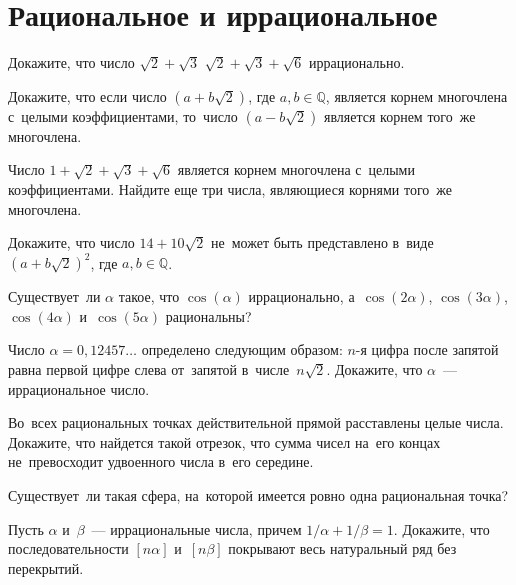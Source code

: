 
\section*{Рациональное и иррациональное}


\begin{problems}

\item
Докажите, что число
\quad
\subproblem $\sqrt{2} + \sqrt{3}$
\quad
\subproblem $\sqrt{2} + \sqrt{3} + \sqrt{6}$
\quad
иррационально.

\item
Докажите, что если число $(a + b \sqrt{2})$, где $a, b \in \mathbb{Q}$,
является корнем многочлена с~целыми коэффициентами, то~число $(a - b \sqrt{2})$ является корнем того~же многочлена.

\item
Число $1 + \sqrt{2} + \sqrt{3} + \sqrt{6}$ является корнем многочлена с~целыми
коэффициентами.
Найдите еще три числа, являющиеся корнями того~же многочлена.

\item
Докажите, что число $14 + 10 \sqrt{2}$ не~может быть представлено в~виде
$(a + b \sqrt{2})^2$, где $a, b \in \mathbb{Q}$.

\item
Существует~ли $\alpha$ такое, что $\cos(\alpha)$ иррационально,
а~$\cos(2 \alpha)$, $\cos(3 \alpha)$, $\cos(4 \alpha)$ и~$\cos(5 \alpha)$
рациональны?

\item
Число $\alpha = 0{,}12457{\ldots}$ определено следующим образом:
$n$-я цифра после запятой равна первой цифре слева от~запятой
в~числе~$n\sqrt{2}$.
Докажите, что $\alpha$~--- иррациональное число.

\item
Во~всех рациональных точках действительной прямой расставлены целые
числа.
Докажите, что найдется такой отрезок, что сумма чисел на~его концах
не~превосходит удвоенного числа в~его середине.

\item
Существует~ли такая сфера, на~которой имеется ровно одна рациональная
точка?

\item
Пусть $\alpha$ и~$\beta$~--- иррациональные числа, причем
$1 / \alpha + 1 / \beta = 1$.
Докажите, что последовательности $[n \alpha]$ и~$[n \beta]$ покрывают весь
натуральный ряд без перекрытий.

\end{problems}

